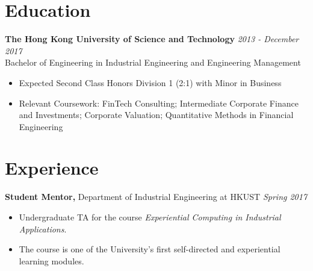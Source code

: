 \documentclass[resmargin]{res}
\begin{document}
 
 
 
\address{{\bfseries Present Address} \\ 329L Undergraduate Hall 6 HKUST \\ Clear Water Bay \\ Hong Kong \\ }
\address{{\bfseries Contact Details} \\ +852 6882 9425 \\ syseo@connect.ust.hk \\ linkedin.com/in/veronicasyseo }

 
\begin{resume} 
 

\section{Education}
{\bf The Hong Kong University of Science and Technology} \hfill \textit{2013 - December 2017} \\
Bachelor of Engineering in Industrial Engineering and Engineering Management
\begin{itemize} \itemsep -2pt %
\item Expected Second Class Honors Division 1 (2:1) with Minor in Business
\item Relevant Coursework: FinTech Consulting; Intermediate Corporate Finance and Investments; Corporate Valuation; Quantitative Methods in Financial Engineering
\end{itemize}
 

\section{Experience}
{\bf Student Mentor,} Department of Industrial Engineering at HKUST \hfill \textit{Spring 2017}
\begin{itemize} \itemsep -2pt %
\item Undergraduate TA for the course \textit{Experiential Computing in Industrial Applications}.
\item The course is one of the University's first self-directed and experiential learning modules.
\end{itemize}


\end{resume}
\end{document}
